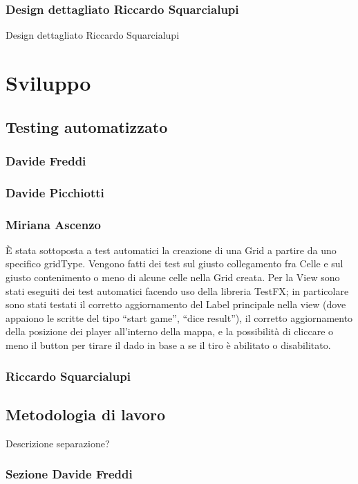 \documentclass[a4paper,12pt]{report}
\begin{document}
\subsection{Design dettagliato Riccardo Squarcialupi}
Design dettagliato Riccardo Squarcialupi

\chapter{Sviluppo}
\section{Testing automatizzato}

\subsection{Davide Freddi}
\subsection{Davide Picchiotti}
\subsection{Miriana Ascenzo}

È stata sottoposta a test automatici la creazione di una Grid a partire da uno specifico gridType.
%
Vengono fatti dei test sul giusto collegamento fra Celle e sul giusto contenimento o meno di alcune celle nella Grid creata.
%
Per la View sono stati eseguiti dei test automatici facendo uso della libreria TestFX; in particolare sono stati testati il corretto aggiornamento del Label principale nella view (dove appaiono le scritte del tipo “start game”, “dice result”),
%
il corretto aggiornamento della posizione dei player all'interno della mappa, e la possibilità di cliccare o meno il button per tirare il dado in base a se il tiro è abilitato o disabilitato.


\subsection{Riccardo Squarcialupi}

\section{Metodologia di lavoro}

Descrizione separazione?

\subsection{Sezione Davide Freddi}
\end{document}
